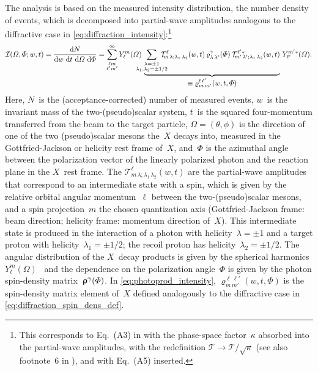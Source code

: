 The analysis is based on the measured intensity distribution, \ie the
number density of events, which is decomposed into partial-wave
amplitudes analogous to the diffractive case in
\cref{eq:diffraction_intensity}:\footnote{\label{fn:photoprod_ampl_redef}This
corresponds to Eq.~(A3) in  with the
phase-space factor~$\kappa$ absorbed into the partial-wave amplitudes,
\ie with the redefinition $\mathcal{T} \to \mathcal{T} /
\sqrt{\kappa}$ (see also footnote~6 in ), and
with Eq.~(A5) inserted.}
\begin{equation}
  \label{eq:photoprod_intensity}
  \mathcal{I}(\Omega, \Phi; w, t)
  = \frac{\dif{N}}{\dif{w}\, \dif{t}\, \dif{\Omega}\, \dif{\Phi}}
  = \sum_{\substack{\ell m \\ \ell' m'}}^\infty
  Y_\ell^m(\Omega)~
  \dUnderbrace{\sum_{\substack{\lambda = \pm 1 \\ \mathclap{\lambda_1, \lambda_2 = \pm 1/2}}}
  \mathcal{T}^\ell_{\!m\, \lambda; \lambda_1\, \lambda_2}(w, t)\,
  \varrho^\gamma_{\lambda\, \lambda'}(\Phi)\,
  \mathcal{T}^{\ell' *}_{\!m'\, \lambda'; \lambda_1\, \lambda_2}(w, t)}{\equiv \varrho^{\ell\, \ell'}_{m\, m'}(w, t, \Phi)}~
  Y_{\ell'}^{m' *}(\Omega).
\end{equation}
Here, $N$~is the (acceptance-corrected) number of measured events,
$w$~is the invariant mass of the two-(pseudo)scalar system, $t$~is the
squared four-momentum transferred from the beam to the target
particle, $\Omega = (\theta, \phi)$ is the direction of one of the two
(pseudo)scalar mesons the~$X$ decays into, measured in the
Gottfried-Jackson or helicity rest frame of~$X$, and~$\Phi$ is the
azimuthal angle between the polarization vector of the linearly
polarized photon and the reaction plane in the $X$~rest frame.  The
$\mathcal{T}^\ell_{\!m\, \lambda; \lambda_1\, \lambda_2}(w, t)$ are
the partial-wave amplitudes that correspond to an intermediate state
with a spin, which is given by the relative orbital angular
momentum~$\ell$ between the two-(pseudo)scalar mesons, and a spin
projection~$m$ \wrt the chosen quantization axis (Gottfried-Jackson
frame: beam direction; helicity frame: momentum direction of~$X$).
This intermediate state is produced in the interaction of a photon
with helicity~$\lambda = \pm 1$ and a target proton with
helicity~$\lambda_1 = \pm 1/2$; the recoil proton has
helicity~$\lambda_2 = \pm 1/2$.  The angular distribution of the
$X$~decay products is given by the spherical harmonics
$Y_\ell^m(\Omega)$~\cite{wikipedia:sphericalHarm} and the dependence
on the polarization angle~$\Phi$ is given by the photon spin-density
matrix~$\bm{\mathrm{\upvarrho}}^\gamma(\Phi)$.  In
\cref{eq:photoprod_intensity}, $\varrho^{\ell\, \ell'}_{m\, m'}(w, t,
\Phi)$ is the spin-density matrix element of~$X$ defined analogously
to the diffractive case in \cref{eq:diffraction_spin_dens_def}.

